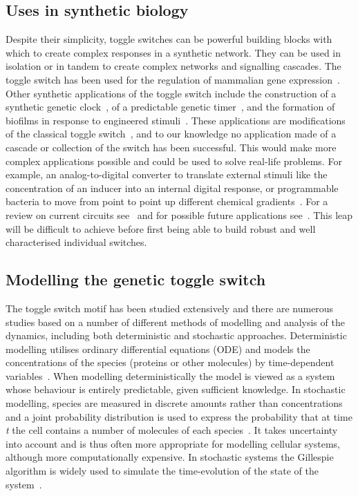 \subsection{Uses in synthetic biology}
Despite their simplicity, toggle switches can be powerful building blocks with which to create complex responses in a synthetic network. They can be used in isolation or in tandem to create complex networks and signalling cascades. The toggle switch has been used for the regulation of mammalian gene expression~\autocite{Deans:2007cy, Kramer:2004kq}. Other synthetic applications of the toggle switch include the construction of a synthetic genetic clock~\autocite{Atkinson:2003tu}, of a predictable genetic timer~\autocite{Ellis:2009hka}, and the formation of biofilms in response to engineered stimuli~\autocite{Kobayashi:2004cv}. These applications are modifications of the classical toggle switch~\autocite{Gardner:2000vha}, and to our knowledge no application made of a cascade or collection of the switch has been successful. This would make more complex applications possible and could be used to solve real-life problems. For example, an analog-to-digital converter to translate external stimuli like the concentration of an inducer into an internal digital response, or programmable bacteria to move from point to point up different chemical gradients~\autocite{Lu:2009ez}. For a review on current circuits see~\autocite{Khalil:2010hm} and for possible future applications see~\autocite{Lu:2009ez}. This leap will be difficult to achieve before first being able to build robust and well characterised individual switches.

\subsection{Modelling the genetic toggle switch} 
The toggle switch motif has been studied extensively and there are numerous studies based on a number of different methods of modelling and analysis of the dynamics, including both deterministic and stochastic approaches. Deterministic modelling utilises ordinary differential equations (ODE) and models the concentrations of the species (proteins or other molecules) by time-dependent variables~\autocite{deJong:2002ft}. When modelling deterministically the model is viewed as a system whose behaviour is entirely predictable, given sufficient knowledge. In stochastic modelling, species are measured in discrete amounts rather than concentrations and a joint probability distribution is used to express the probability that at time \textit{t} the cell contains a number of molecules of each species~\autocite{deJong:2002ft,Wilkinson:2006td}. It takes uncertainty into account and is thus often more appropriate for modelling cellular systems, although more computationally expensive. In stochastic systems the Gillespie algorithm is widely used to simulate the time-evolution of the state of the system~\autocite{Warren:2005kea}.


